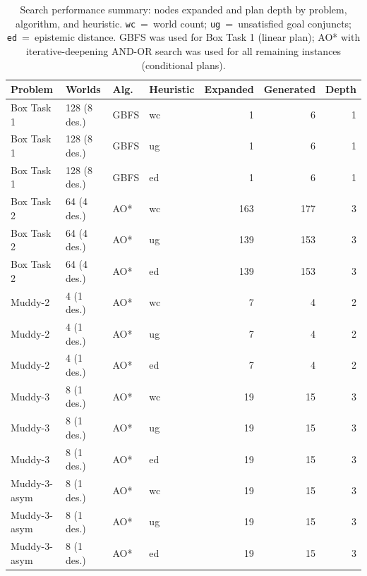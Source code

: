 \documentclass[12pt,a4paper]{article}
\theoremstyle{definition}
\theoremstyle{plain}
\begin{document}
\begin{table}[H]
\centering
\caption{Search performance summary: nodes expanded and plan depth by problem, algorithm, and
heuristic. \texttt{wc}~=~world count; \texttt{ug}~=~unsatisfied goal conjuncts;
\texttt{ed}~=~epistemic distance. GBFS was used for Box Task 1 (linear plan); AO* with
iterative-deepening AND-OR search was used for all remaining instances (conditional plans).}
\label{tab:results_summary}
\renewcommand{\arraystretch}{1.2}
\begin{tabular}{llllrrr}
\toprule
\textbf{Problem} & \textbf{Worlds} & \textbf{Alg.} & \textbf{Heuristic} &
\textbf{Expanded} & \textbf{Generated} & \textbf{Depth} \\
\midrule
Box Task 1   & 128 (8 des.)  & GBFS & wc & 1   & 6   & 1 \\
Box Task 1   & 128 (8 des.)  & GBFS & ug & 1   & 6   & 1 \\
Box Task 1   & 128 (8 des.)  & GBFS & ed & 1   & 6   & 1 \\
\midrule
Box Task 2   & 64 (4 des.)   & AO*  & wc & 163 & 177 & 3 \\
Box Task 2   & 64 (4 des.)   & AO*  & ug & 139 & 153 & 3 \\
Box Task 2   & 64 (4 des.)   & AO*  & ed & 139 & 153 & 3 \\
\midrule
Muddy-2      & 4 (1 des.)    & AO*  & wc & 7   & 4   & 2 \\
Muddy-2      & 4 (1 des.)    & AO*  & ug & 7   & 4   & 2 \\
Muddy-2      & 4 (1 des.)    & AO*  & ed & 7   & 4   & 2 \\
\midrule
Muddy-3      & 8 (1 des.)    & AO*  & wc & 19  & 15  & 3 \\
Muddy-3      & 8 (1 des.)    & AO*  & ug & 19  & 15  & 3 \\
Muddy-3      & 8 (1 des.)    & AO*  & ed & 19  & 15  & 3 \\
\midrule
Muddy-3-asym & 8 (1 des.)    & AO*  & wc & 19  & 15  & 3 \\
Muddy-3-asym & 8 (1 des.)    & AO*  & ug & 19  & 15  & 3 \\
Muddy-3-asym & 8 (1 des.)    & AO*  & ed & 19  & 15  & 3 \\
\bottomrule
\end{tabular}
\end{table}
\end{document}
